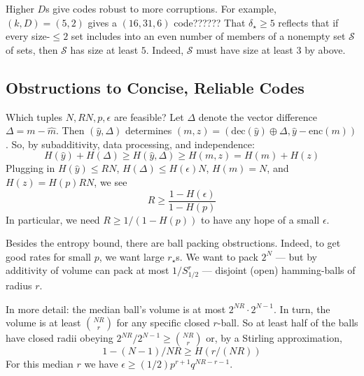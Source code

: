 \documentclass[12pt]{article}
\newcommand{\msec}[1]{\subsection*{\color{mblu}\textsf{#1}}}
\newcommand{\mpar}[1]{%
    \makebox[0cm]{\hspace{-4.75cm}\parbox{2.5cm}{\raggedleft\color{mblulite}\textsf{#1}}}%
}
\newcommand{\Ss}{\mathcal{S}}
\theoremstyle{definition}
\newcommand{\enc}{\text{enc}}
\newcommand{\dec}{\text{dec}}
\begin{document}
    Higher $D$s give codes robust to more corruptions.
    For example, $(k,D)=(5,2)$ gives a $(16,31,6)$ code??????
    That $\delta_\star\geq 5$ reflects that if every size-$\leq 2$ set includes
    into an even number of members of a nonempty set $\Ss$ of sets, then $\Ss$
    has size at least $5$.
    Indeed, $\Ss$ must have size at least $3$ by above. 


\msec{Obstructions to Concise, Reliable Codes}


    \indent\par
    \mpar{entropy}%
    Which tuples $N, RN, p, \epsilon$ are feasible?  Let $\Delta$ denote the
    vector difference $\Delta=m-\hat m$.  
    Then $(\hat y, \Delta)$ determines
    $
        (m,z) = (\dec(\hat y)\oplus\Delta, \hat y - \enc(m))
    $.
    So, by subadditivity, data processing, and independence:
    $$
        H(\hat y)+H(\Delta)
        \geq
        H(\hat y,\Delta)
        \geq
        H(m,z)
        =
        H(m)+H(z) 
    $$
    Plugging in $H(\hat y)\leq RN$,
    $H(\Delta) \leq H(\epsilon)N$,
    $H(m)=N$, and
    $H(z)=H(p)RN$, we see
    $$
        R \geq \frac{1-H(\epsilon)}{1-H(p)}
    $$
    In particular, we need $R \geq 1/(1-H(p))$ to have any hope
    of a small $\epsilon$.

    
    \mpar{volume}%
    Besides the entropy bound, there are ball packing obstructions.  Indeed, to
    get good rates for small $p$, we want large $r_\star$s.  We want to pack
    $2^N$ --- but by additivity of volume can pack at most $1/S^r_{1/2}$ ---
    disjoint (open) hamming-balls of radius $r$. 

    In more detail: the median ball's volume is at most $2^{NR}\cdot 2^{N-1}$. 
    In turn,
    the volume is at least ${NR\choose r}$ for any specific closed $r$-ball.
    So at least half of the balls have closed radii obeying
    $
        2^{NR}/2^{N-1} \geq {NR\choose r}
    $
    or, by a Stirling approximation,
    $$
        1-(N-1)/NR \geq H(r/(NR)) 
    $$
    For this median $r$ we have
    $
        \epsilon \geq (1/2) p^{r+1}q^{NR-r-1} 
    $.
\end{document}
